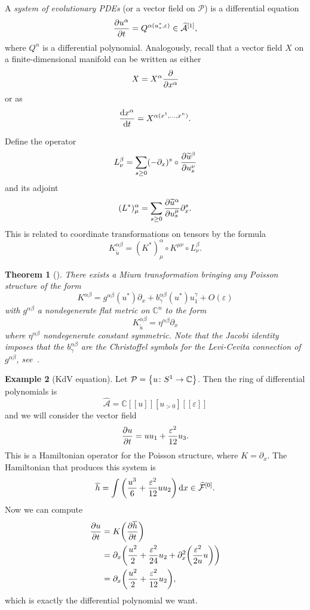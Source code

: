 \documentclass[leqno, openany]{memoir}
\newtheorem{thm}{Theorem}[section]
\theoremstyle{definition}
\newtheorem{exm}[thm]{Example}
\theoremstyle{remark}
\theoremstyle{plain}
\theoremstyle{definition}
\theoremstyle{remark}
\newcommand{\C}{\mathbb{C}}
\newcommand{\ep}{\varepsilon}
\newcommand{\mc}[1]{\mathcal{#1}}
\newcommand{\ol}[1]{\overline{#1}}
\newcommand{\wt}[1]{\widetilde{#1}}
\newcommand{\wh}[1]{\widehat{#1}}
\begin{document}
A \textit{system of evolutionary PDEs} (or a vector field on $\mc{P}$) is a differential equation
\[ \pdv{u^{\alpha}}{t} = Q^{\alpha(u_*^*, \ep)} \in \wh{\mc{A}}^{[1]}, \]
where $Q^{\alpha}$ is a differential polynomial. Analogously, recall that a vector field $X$ on a finite-dimensional manifold can be written as either
\[ X = X^{\alpha} \pdv{x^{\alpha}} \]
or as 
\[ \dv{x^{\alpha}}{t} = X^{\alpha(x^1, \ldots, x^n)}. \]

Define the operator
\[ L_{\nu}^{\beta} = \sum_{s \geq 0} (-\partial_x)^s \circ \pdv{\wt{u}^{\beta}}{u_s^{\nu}} \]
and its adjoint
\[ (L^*)_{\mu}^{\alpha} = \sum_{s \geq 0} \pdv{\wt{u}^{\alpha}}{u_s^{\mu}} \partial_x^s. \]
This is related to coordinate transformations on tensors by the formula
\[ K_{\wt{u}}^{\alpha\beta} = (K^*)_{\mu}^{\alpha} \circ K^{\mu\nu} \circ L_{\nu}^{\beta}. \]

\begin{thm}[\cite{darbouxhamiltonian}]
    There exists a Miura transformation bringing any Poisson structure of the form
    \[ K^{\alpha\beta} = g^{\alpha\beta}(u^*) \partial_x + b_{\gamma}^{\alpha\beta}(u^*) u_1^{\gamma} + O(\ep) \]
    with $g^{\alpha\beta}$ a nondegenerate flat metric on $\C^n$ to the form
    \[ K_{\wt{u}}^{\alpha\beta} = \eta^{\alpha\beta} \partial_x \]
    where $\eta^{\alpha\beta}$ nondegenerate constant symmetric. Note that the Jacobi identity imposes that the $b_{\gamma}^{\alpha\beta}$ are the Christoffel symbols for the Levi-Cevita connection of $g^{\alpha\beta}$, see~\cite{dubnov}.
\end{thm}

\begin{exm}[KdV equation]\label{exm:kdv}
    Let $\mc{P} = \qty{u \colon S^1 \to \C}$. Then the ring of differential polynomials is
    \[ \wh{\mc{A}} = \C[[u]] [u_{>0}] [[\ep]] \]
    and we will consider the vector field
    \[ \pdv{u}{t} = u u_1 + \frac{\ep^2}{12} u_3. \]
    This is a Hamiltonian operator for the Poisson structure, where $K = \partial_x$. The Hamiltonian that produces this system is
    \[ \ol{h} = \int \qty(\frac{u^3}{6} + \frac{\ep^2}{12} u u_2) \dd{x} \in \wh{\mc{F}}^{[0]}. \]
    Now we can compute
    \begin{align*}
        \pdv{u}{t} &= K \qty(\pdv{\ol{h}}{t}) \\
        &= \partial_x \qty(\frac{u^2}{2} + \frac{\ep^2}{24} u_2 + \partial_x^2 \qty(\frac{\ep^2}{2u}u)) \\
        &= \partial_x \qty(\frac{u^2}{2} + \frac{\ep^2}{12} u_2),
    \end{align*}
    which is exactly the differential polynomial we want.
\end{exm}
\end{document}
